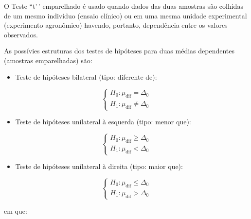 \documentclass[
]{book}
\providecommand{\tightlist}{%
  \setlength{\itemsep}{0pt}\setlength{\parskip}{0pt}}
\begin{document}
\hfill\break

O Teste ``t'\,' emparelhado é usado quando dados das duas amostras são colhidas de um mesmo indivíduo (ensaio clínico) ou em uma mesma unidade experimental (experimento agronômico) havendo, portanto, dependência entre os valores observados.

\hfill\break

As possívies estruturas dos testes de hipóteses para duas médias dependentes (amostras emparelhadas) são:

\hfill\break

\begin{itemize}
\tightlist
\item
  Teste de hipóteses bilateral (tipo: diferente de):
\end{itemize}

\hfill\break

\[
\begin{cases}
  H_{0}: \mu_{\text{dif}} = \Delta_{0} \\
  H_{1}: \mu_{\text{dif}} \ne \Delta_{0}
\end{cases}
\]

\hfill\break

\begin{itemize}
\tightlist
\item
  Teste de hipóteses unilateral à esquerda (tipo: menor que):
\end{itemize}

\hfill\break

\[
\begin{cases}
  H_{0}: \mu_{\text{dif}} \ge \Delta_{0} \\
  H_{1}: \mu_{\text{dif}} < \Delta_{0}  
\end{cases}
\]

\hfill\break

\begin{itemize}
\tightlist
\item
  Teste de hipóteses unilateral à direita (tipo: maior que):
\end{itemize}

\hfill\break

\[
\begin{cases}
  H_{0}: \mu_{\text{dif}} \le \Delta_{0} \\
  H_{1}: \mu_{\text{dif}} > \Delta_{0}  
\end{cases}
\]

\hfill\break
em que:

\hfill\break
\end{document}
